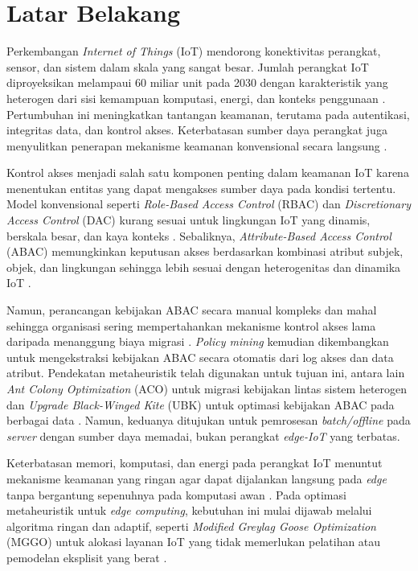 \section{Latar Belakang}

Perkembangan \textit{Internet of Things} (IoT)\label{first:iot} mendorong konektivitas perangkat, sensor, dan sistem dalam skala yang sangat besar.
Jumlah perangkat IoT diproyeksikan melampaui 60 miliar unit pada 2030 dengan karakteristik yang heterogen dari sisi kemampuan komputasi, energi, dan konteks penggunaan \parencite{ahsan_comprehensive_2025}.
Pertumbuhan ini meningkatkan tantangan keamanan, terutama pada autentikasi, integritas data, dan kontrol akses.
Keterbatasan sumber daya perangkat juga menyulitkan penerapan mekanisme keamanan konvensional secara langsung \parencite{dritsas_survey_2025}.

Kontrol akses menjadi salah satu komponen penting dalam keamanan IoT karena menentukan entitas yang dapat mengakses sumber daya pada kondisi tertentu.
Model konvensional seperti \textit{Role-Based Access Control} (RBAC)\label{first:rbac} dan \textit{Discretionary Access Control} (DAC)\label{first:dac} kurang sesuai untuk lingkungan IoT yang dinamis, berskala besar, dan kaya konteks \parencite{ragothaman_access_2023}.
Sebaliknya, \textit{Attribute-Based Access Control} (ABAC)\label{first:abac} memungkinkan keputusan akses berdasarkan kombinasi atribut subjek, objek, dan lingkungan sehingga lebih sesuai dengan heterogenitas dan dinamika IoT \parencite{ahsan_comprehensive_2025}.

Namun, perancangan kebijakan ABAC secara manual kompleks dan mahal sehingga organisasi sering mempertahankan mekanisme kontrol akses lama daripada menanggung biaya migrasi \parencite{diaz-rodriguez_abac_2025}.
\textit{Policy mining} kemudian dikembangkan untuk mengekstraksi kebijakan ABAC secara otomatis dari log akses dan data atribut.
Pendekatan metaheuristik telah digunakan untuk tujuan ini, antara lain \textit{Ant Colony Optimization} (ACO)\label{first:aco} untuk migrasi kebijakan lintas sistem heterogen \parencite{siyuan_abac_2025} dan \textit{Upgrade Black-Winged Kite} (UBK)\label{first:ubk} untuk optimasi kebijakan ABAC pada berbagai data \parencite{li_attribute_2026}.
Namun, keduanya ditujukan untuk pemrosesan \textit{batch/offline} pada \textit{server} dengan sumber daya memadai, bukan perangkat \textit{edge-IoT} yang terbatas.

Keterbatasan memori, komputasi, dan energi pada perangkat IoT menuntut mekanisme keamanan yang ringan agar dapat dijalankan langsung pada \textit{edge} tanpa bergantung sepenuhnya pada komputasi awan \parencite{canavese_security_2024}.
Pada optimasi metaheuristik untuk \textit{edge computing}, kebutuhan ini mulai dijawab melalui algoritma ringan dan adaptif, seperti \textit{Modified Greylag Goose Optimization} (MGGO)\label{first:mggo} untuk alokasi layanan IoT yang tidak memerlukan pelatihan atau pemodelan eksplisit yang berat \parencite{khosrowshahi_refined_2025}.

